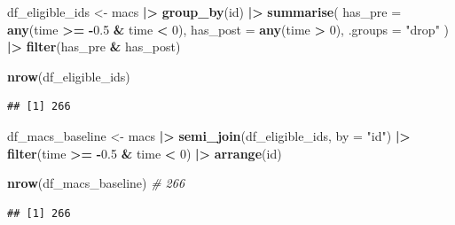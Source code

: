 \documentclass[
]{article}
\newenvironment{Shaded}{\begin{snugshade}}{\end{snugshade}}
\newcommand{\AttributeTok}[1]{\textcolor[rgb]{0.13,0.29,0.53}{#1}}
\newcommand{\CommentTok}[1]{\textcolor[rgb]{0.56,0.35,0.01}{\textit{#1}}}
\newcommand{\DecValTok}[1]{\textcolor[rgb]{0.00,0.00,0.81}{#1}}
\newcommand{\FloatTok}[1]{\textcolor[rgb]{0.00,0.00,0.81}{#1}}
\newcommand{\FunctionTok}[1]{\textcolor[rgb]{0.13,0.29,0.53}{\textbf{#1}}}
\newcommand{\NormalTok}[1]{#1}
\newcommand{\OtherTok}[1]{\textcolor[rgb]{0.56,0.35,0.01}{#1}}
\newcommand{\SpecialCharTok}[1]{\textcolor[rgb]{0.81,0.36,0.00}{\textbf{#1}}}
\newcommand{\StringTok}[1]{\textcolor[rgb]{0.31,0.60,0.02}{#1}}
\begin{document}
\begin{Shaded}
\begin{Highlighting}[]
\NormalTok{df\_eligible\_ids }\OtherTok{\textless{}{-}}\NormalTok{ macs }\SpecialCharTok{|\textgreater{}}
  \FunctionTok{group\_by}\NormalTok{(id) }\SpecialCharTok{|\textgreater{}}
  \FunctionTok{summarise}\NormalTok{(}
    \AttributeTok{has\_pre =} \FunctionTok{any}\NormalTok{(time }\SpecialCharTok{\textgreater{}=} \SpecialCharTok{{-}}\FloatTok{0.5} \SpecialCharTok{\&}\NormalTok{ time }\SpecialCharTok{\textless{}} \DecValTok{0}\NormalTok{),}
    \AttributeTok{has\_post =} \FunctionTok{any}\NormalTok{(time }\SpecialCharTok{\textgreater{}} \DecValTok{0}\NormalTok{),}
    \AttributeTok{.groups =} \StringTok{"drop"}
\NormalTok{  ) }\SpecialCharTok{|\textgreater{}}
  \FunctionTok{filter}\NormalTok{(has\_pre }\SpecialCharTok{\&}\NormalTok{ has\_post)}

\FunctionTok{nrow}\NormalTok{(df\_eligible\_ids)  }
\end{Highlighting}
\end{Shaded}

\begin{verbatim}
## [1] 266
\end{verbatim}

\begin{Shaded}
\begin{Highlighting}[]
\NormalTok{df\_macs\_baseline }\OtherTok{\textless{}{-}}\NormalTok{ macs }\SpecialCharTok{|\textgreater{}}
  \FunctionTok{semi\_join}\NormalTok{(df\_eligible\_ids, }\AttributeTok{by =} \StringTok{"id"}\NormalTok{) }\SpecialCharTok{|\textgreater{}}
  \FunctionTok{filter}\NormalTok{(time }\SpecialCharTok{\textgreater{}=} \SpecialCharTok{{-}}\FloatTok{0.5} \SpecialCharTok{\&}\NormalTok{ time }\SpecialCharTok{\textless{}} \DecValTok{0}\NormalTok{) }\SpecialCharTok{|\textgreater{}}
  \FunctionTok{arrange}\NormalTok{(id)}

\FunctionTok{nrow}\NormalTok{(df\_macs\_baseline)             }\CommentTok{\# 266}
\end{Highlighting}
\end{Shaded}

\begin{verbatim}
## [1] 266
\end{verbatim}

\begin{Shaded}
\end{Shaded}
\end{document}
